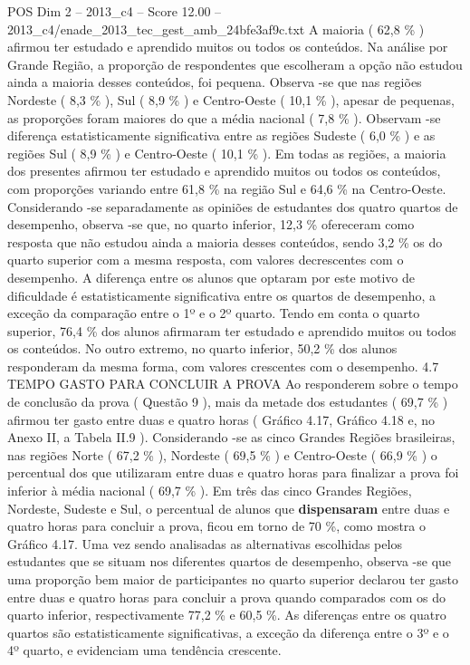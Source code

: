 \begin{textsample}{POS Dim 2 – 2013\_c4 – Score 12.00 – 2013\_c4/enade\_2013\_tec\_gest\_amb\_24bfe3af9c.txt}
A maioria ( 62,8 \% ) afirmou ter estudado e aprendido muitos ou todos os conteúdos.
Na análise por Grande Região, a proporção de respondentes que escolheram a opção não estudou ainda a maioria desses conteúdos, foi pequena.
Observa -se que nas regiões Nordeste ( 8,3 \% ), Sul ( 8,9 \% ) e Centro-Oeste ( 10,1 \% ), apesar de pequenas, as proporções foram maiores do que a média nacional ( 7,8 \% ).
Observam -se diferença estatisticamente significativa entre as regiões Sudeste ( 6,0 \% ) e as regiões Sul ( 8,9 \% ) e Centro-Oeste ( 10,1 \% ).
Em todas as regiões, a maioria dos presentes afirmou ter estudado e aprendido muitos ou todos os conteúdos, com proporções variando entre 61,8 \% na região Sul e 64,6 \% na Centro-Oeste.
Considerando -se separadamente as opiniões de estudantes dos quatro quartos de desempenho, observa -se que, no quarto inferior, 12,3 \% ofereceram como resposta que não estudou ainda a maioria desses conteúdos, sendo 3,2 \% os do quarto superior com a mesma resposta, com valores decrescentes com o desempenho.
A diferença entre os alunos que optaram por este motivo de dificuldade é estatisticamente significativa entre os quartos de desempenho, a exceção da comparação entre o 1º e o 2º quarto.
Tendo em conta o quarto superior, 76,4 \% dos alunos afirmaram ter estudado e aprendido muitos ou todos os conteúdos.
No outro extremo, no quarto inferior, 50,2 \% dos alunos responderam da mesma forma, com valores crescentes com o desempenho. 4.7 TEMPO GASTO PARA CONCLUIR A PROVA Ao responderem sobre o tempo de conclusão da prova ( Questão 9 ), mais da metade dos estudantes ( 69,7 \% ) afirmou ter gasto entre duas e quatro horas ( Gráfico 4.17, Gráfico 4.18 e, no Anexo II, a Tabela II.9 ).
Considerando -se as cinco Grandes Regiões brasileiras, nas regiões Norte ( 67,2 \% ), Nordeste ( 69,5 \% ) e Centro-Oeste ( 66,9 \% ) o percentual dos que utilizaram entre duas e quatro horas para finalizar a prova foi inferior à média nacional ( 69,7 \% ).
Em três das cinco Grandes Regiões, Nordeste, Sudeste e Sul, o percentual de alunos que \textbf{dispensaram} entre duas e quatro horas para concluir a prova, ficou em torno de 70 \%, como mostra o Gráfico 4.17.
Uma vez sendo analisadas as alternativas escolhidas pelos estudantes que se situam nos diferentes quartos de desempenho, observa -se que uma proporção bem maior de participantes no quarto superior declarou ter gasto entre duas e quatro horas para concluir a prova quando comparados com os do quarto inferior, respectivamente 77,2 \% e 60,5 \%.
As diferenças entre os quatro quartos são estatisticamente significativas, a exceção da diferença entre o 3º e o 4º quarto, e evidenciam uma tendência crescente.

\end{textsample}
